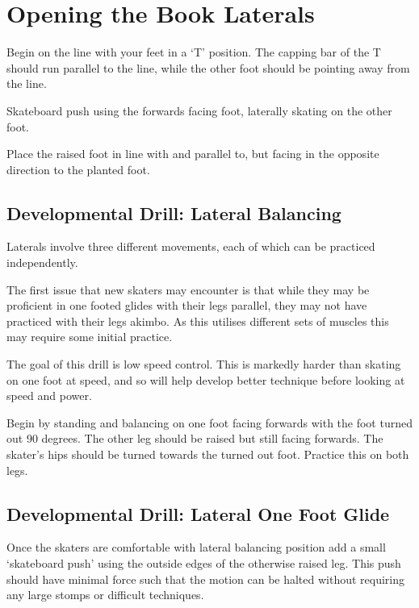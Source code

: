 \section{Opening the Book Laterals}

Begin on the line with your feet in a `T' position. The capping bar of the T should run parallel to the line, while the other foot should be pointing away from the line.     

Skateboard push using the forwards facing foot, laterally skating on the other foot.   

Place the raised foot in line with and parallel to, but facing in the opposite direction to the planted foot.   





\subsection*{Developmental Drill: Lateral Balancing}
\label{drill:lateral/book/balancing}

Laterals involve three different movements, each of which can be practiced independently. 

The first issue that new skaters may encounter is that while they may be proficient in one footed glides with their legs parallel, they may not have practiced with their legs akimbo.     
As this utilises different sets of muscles this may require some initial practice.


The goal of this drill is low speed control. 
This is markedly harder than skating on one foot at speed, and so will help develop better technique before looking at speed and power.   



Begin by standing and balancing on one foot facing forwards with the foot turned out 90 degrees.
The other leg should be raised but still facing forwards. 
The skater's hips should be turned towards the turned out foot. 
Practice this on both legs.


\subsection*{Developmental Drill: Lateral One Foot Glide}
\label{drill:lateral/book/glide}

Once the skaters are comfortable with lateral balancing position add a small `skateboard push' using the outside edges of the otherwise raised leg.
This push should have minimal force such that the motion can be halted without requiring any large stomps or difficult techniques.    

